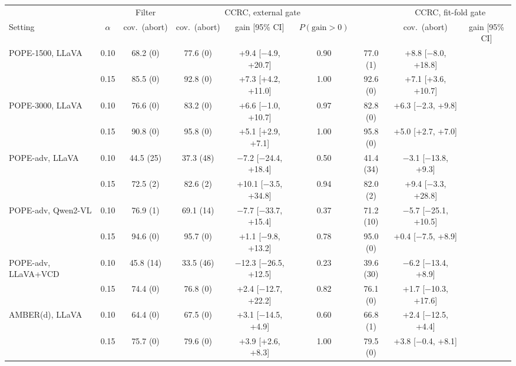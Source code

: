\begin{tabular}{lcccccccc}
\toprule
 & & Filter & \multicolumn{3}{c}{CCRC, external gate} & & \multicolumn{2}{c}{CCRC, fit-fold gate}\\
\cmidrule(lr){4-6}\cmidrule(lr){8-9}
Setting & $\alpha$ & cov.\ (abort) & cov.\ (abort) & gain [95\% CI] & $P(\text{gain}>0)$ & & cov.\ (abort) & gain [95\% CI]\\
\midrule
POPE-1500, LLaVA & 0.10 & 68.2 (0) & 77.6 (0) & +9.4 [$-$4.9, +20.7] & 0.90 & 77.0 (1) & +8.8 [$-$8.0, +18.8]\\
 & 0.15 & 85.5 (0) & 92.8 (0) & +7.3 [+4.2, +11.0] & 1.00 & 92.6 (0) & +7.1 [+3.6, +10.7]\\
\addlinespace
POPE-3000, LLaVA & 0.10 & 76.6 (0) & 83.2 (0) & +6.6 [$-$1.0, +10.7] & 0.97 & 82.8 (0) & +6.3 [$-$2.3, +9.8]\\
 & 0.15 & 90.8 (0) & 95.8 (0) & +5.1 [+2.9, +7.1] & 1.00 & 95.8 (0) & +5.0 [+2.7, +7.0]\\
\addlinespace
POPE-adv, LLaVA & 0.10 & 44.5 (25) & 37.3 (48) & $-$7.2 [$-$24.4, +18.4] & 0.50 & 41.4 (34) & $-$3.1 [$-$13.8, +9.3]\\
 & 0.15 & 72.5 (2) & 82.6 (2) & +10.1 [$-$3.5, +34.8] & 0.94 & 82.0 (2) & +9.4 [$-$3.3, +28.8]\\
\addlinespace
POPE-adv, Qwen2-VL & 0.10 & 76.9 (1) & 69.1 (14) & $-$7.7 [$-$33.7, +15.4] & 0.37 & 71.2 (10) & $-$5.7 [$-$25.1, +10.5]\\
 & 0.15 & 94.6 (0) & 95.7 (0) & +1.1 [$-$9.8, +13.2] & 0.78 & 95.0 (0) & +0.4 [$-$7.5, +8.9]\\
\addlinespace
POPE-adv, LLaVA+VCD & 0.10 & 45.8 (14) & 33.5 (46) & $-$12.3 [$-$26.5, +12.5] & 0.23 & 39.6 (30) & $-$6.2 [$-$13.4, +8.9]\\
 & 0.15 & 74.4 (0) & 76.8 (0) & +2.4 [$-$12.7, +22.2] & 0.82 & 76.1 (0) & +1.7 [$-$10.3, +17.6]\\
\addlinespace
AMBER(d), LLaVA & 0.10 & 64.4 (0) & 67.5 (0) & +3.1 [$-$14.5, +4.9] & 0.60 & 66.8 (1) & +2.4 [$-$12.5, +4.4]\\
 & 0.15 & 75.7 (0) & 79.6 (0) & +3.9 [+2.6, +8.3] & 1.00 & 79.5 (0) & +3.8 [$-$0.4, +8.1]\\
\bottomrule
\end{tabular}
